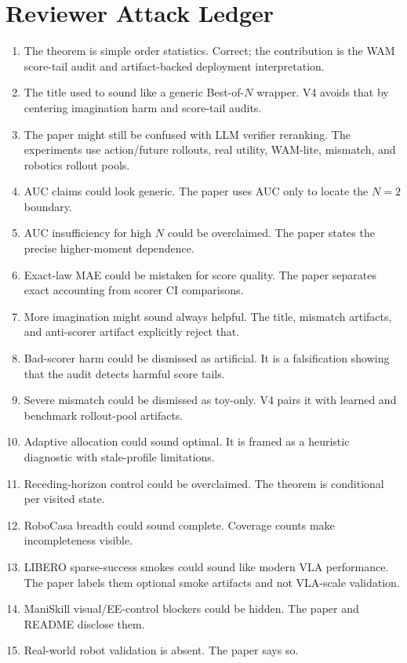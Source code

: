 \section{Reviewer Attack Ledger}
\label{app:attack-ledger}

\begin{enumerate}
\item The theorem is simple order statistics. Correct; the contribution is the
WAM score-tail audit and artifact-backed deployment interpretation.
\item The title used to sound like a generic Best-of-$N$ wrapper. V4 avoids
that by centering imagination harm and score-tail audits.
\item The paper might still be confused with LLM verifier reranking. The
experiments use action/future rollouts, real utility, WAM-lite, mismatch, and
robotics rollout pools.
\item AUC claims could look generic. The paper uses AUC only to locate the
$N=2$ boundary.
\item AUC insufficiency for high $N$ could be overclaimed. The paper states
the precise higher-moment dependence.
\item Exact-law MAE could be mistaken for score quality. The paper separates
exact accounting from scorer CI comparisons.
\item More imagination might sound always helpful. The title, mismatch
artifacts, and anti-scorer artifact explicitly reject that.
\item Bad-scorer harm could be dismissed as artificial. It is a falsification
showing that the audit detects harmful score tails.
\item Severe mismatch could be dismissed as toy-only. V4 pairs it with learned
and benchmark rollout-pool artifacts.
\item Adaptive allocation could sound optimal. It is framed as a heuristic
diagnostic with stale-profile limitations.
\item Receding-horizon control could be overclaimed. The theorem is
conditional per visited state.
\item RoboCasa breadth could sound complete. Coverage counts make incompleteness
visible.
\item LIBERO sparse-success smokes could sound like modern VLA performance.
The paper labels them optional smoke artifacts and not VLA-scale validation.
\item ManiSkill visual/EE-control blockers could be hidden. The paper and
README disclose them.
\item Real-world robot validation is absent. The paper says so.

\end{enumerate}
